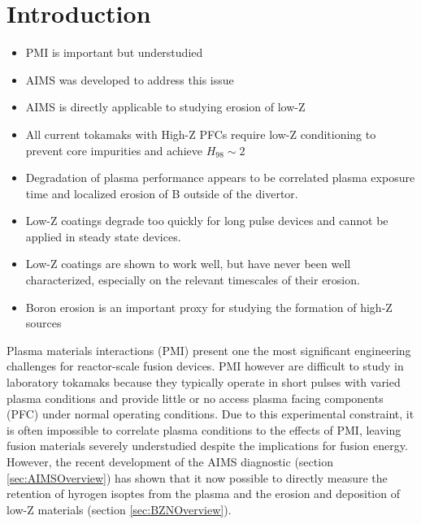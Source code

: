\documentclass[final,3p,times,twocolumn]{elsarticle}
\begin{document}
\begin{frontmatter}
\begin{keyword}


\end{keyword}

\end{frontmatter}

\section{Introduction}
\begin{itemize}
	\item PMI is important but understudied
	\item AIMS was developed to address this issue
	\item AIMS is directly applicable to studying erosion of low-Z
	\item All current tokamaks with High-Z PFCs require low-Z conditioning to prevent core impurities and achieve $H_{98}\sim 2$
	\item Degradation of plasma performance appears to be correlated plasma exposure time and localized erosion of B outside of the divertor.
	\item Low-Z coatings degrade too quickly for long pulse devices and cannot be applied in steady state devices.
	\item Low-Z coatings are shown to work well, but have never been well characterized, especially on the relevant timescales of their erosion.
	\item Boron erosion is an important proxy for studying the formation of high-Z sources 
\end{itemize}

Plasma materials interactions (PMI) present one the most significant engineering challenges for reactor-scale fusion devices.  PMI however are difficult to study in laboratory tokamaks because they typically operate in short pulses with varied plasma conditions and provide little or no access plasma facing components (PFC) under normal operating conditions.  Due to this experimental constraint, it is often impossible to correlate plasma conditions to the effects of PMI, leaving fusion materials severely understudied despite the implications for fusion energy.  However, the recent development of the AIMS diagnostic \cite{RSIPaper} (section \ref{sec:AIMSOverview}) has shown that it now possible to directly measure the retention of hyrogen isoptes from the plasma \cite{HartwigDRetention} and the erosion and deposition of low-Z materials (section \ref{sec:BZNOverview}).
\end{document}
